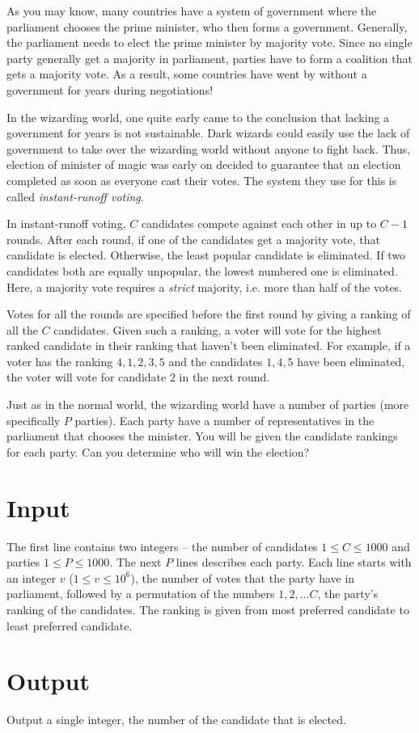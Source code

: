 As you may know, many countries have a system of government where the parliament chooses the prime minister, who then forms a government.
Generally, the parliament needs to elect the prime minister by majority vote.
Since no single party generally get a majority in parliament, parties have to form a coalition that gets a majority vote.
As a result, some countries have went by without a government for years during negotiations!

In the wizarding world, one quite early came to the conclusion that lacking a government for years is not sustainable.
Dark wizards could easily use the lack of government to take over the wizarding world without anyone to fight back.
Thus, election of minister of magic was early on decided to guarantee that an election completed as soon as everyone cast their votes.
The system they use for this is called \emph{instant-runoff voting}.

In instant-runoff voting, $C$ candidates compete against each other in up to $C - 1$ rounds.
After each round, if one of the candidates get a majority vote, that candidate is elected.
Otherwise, the least popular candidate is eliminated.
If two candidates both are equally unpopular, the lowest numbered one is eliminated.
Here, a majority vote requires a \emph{strict} majority, i.e. more than half of the votes.

Votes for all the rounds are specified before the first round by giving a ranking of all the $C$ candidates.
Given such a ranking, a voter will vote for the highest ranked candidate in their ranking that haven't been eliminated.
For example, if a voter has the ranking $4, 1, 2, 3, 5$ and the candidates $1, 4, 5$ have been eliminated, the voter will vote for candidate $2$ in the next round.

Just as in the normal world, the wizarding world have a number of parties (more specifically $P$ parties).
Each party have a number of representatives in the parliament that chooses the minister.
You will be given the candidate rankings for each party.
Can you determine who will win the election?

\section*{Input}
The first line contains two integers -- the number of candidates $1 \le C \le 1000$ and parties $1 \le P \le 1000$.
The next $P$ lines describes each party.
Each line starts with an integer $v$ ($1 \le v \le 10^6$), the number of votes that the party have in parliament, followed by a permutation of the numbers $1, 2, \dots C$, the party's ranking of the candidates.
The ranking is given from most preferred candidate to least preferred candidate.

\section*{Output}
Output a single integer, the number of the candidate that is elected.
